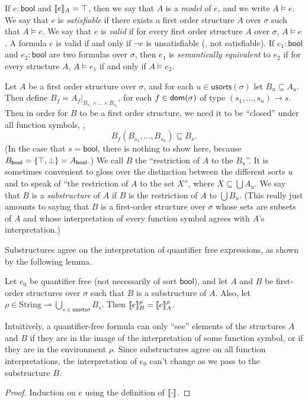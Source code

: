 If $e : \mathsf{bool}$ and $\llbracket{e}\rrbracket_A = \top$,
  then we say that $A$ is a \emph{model} of $e$,
  and we write $A \models e$.
We say that $e$ is \emph{satisfiable} if there exists a first order structure $A$ over $\sigma$ such that $A\models e$.
We say that $e$ is \emph{valid} if for every first order structure $A$ over $\sigma$, $A\models e$.
A formula $e$ is valid if and only if $\neg e$ is unsatisfiable (\ie, not satisfiable).
%
If $e_1 : \mathsf{bool}$ and $e_2 : \mathsf{bool}$ are two formulas over $\sigma$,
then $e_1$  is \emph{semantically equivalent} to $e_2$ if for every structure $A$,
$A\models e_1$ if and only if $A\models e_2$.

Let $A$ be a first order structure over $\sigma$,
and for each $u\in\mathsf{usorts}(\sigma)$ let $B_u\subseteq A_u$.
Then define $B_f = A_f|_{B_{s_1}\times\dots\times B_{s_{n}}}$,
for each $f \in \mathsf{dom}(\sigma)$ of type $(s_1, \dots, s_n)\to s$.
Then in order for $B$ to be a first order structure,
we need it to be ``closed'' under all function symbols, \ie,
\[
  B_f(B_{s_1}, \dots, B_{s_n}) \subseteq B_s.
\]
(In the case that $s = \mathsf{bool}$, there is nothing to show here,
because $B_{\mathsf{bool}} = \left\{{\top, \bot}\right\} = A_{\mathsf{bool}}$.)
We call $B$ the ``restriction of $A$ to the $B_u$''.
It is sometimes convenient to gloss over the distinction between the different sorts $u$
and to speak of ``the restriction of $A$ to the set $X$'', where $X \subseteq \bigcup A_u$.
We say that $B$ is a \emph{substructure} of $A$ if $B$ is the restriction of $A$ to $\bigcup B_u$.
(This really just amounts to saying that $B$ is a first-order structure over $\sigma$
whose sets are subsets of $A$
and whose interpretation of every function symbol agrees with $A$'s interpretation.)

Substructures agree on the interpretation of quantifier free expressions,
as shown by the following lemma.
\begin{lemma}\label{lem:qf-denote-substruct}
  Let $e_0$ be quantifier free (not necessarily of sort $\mathsf{bool}$),
  and let $A$ and $B$ be first-order structures over $\sigma$
  such that $B$ is a substructure of $A$.
  Also, let $\rho \in \mathrm{String} \rightharpoonup \bigcup_{s\in\mathsf{usorts}\sigma} B_s$.
  Then $\llbracket{e}\rrbracket_B^\rho = \llbracket{e}\rrbracket_A^\rho$.

  Intuitively, a quantifier-free formula can only ``see'' elements
    of the structures $A$ and $B$
    if they are in the image of the interpretation of some function symbol,
    or if they are in the environment $\rho$.
  Since substructures agree on all function interpretations,
    the interpretation of $e_0$ can't change as we pass to the substructure $B$.
\end{lemma}
\begin{proof}
  Induction on $e$ using the definition of $\llbracket{\cdot}\rrbracket$.
\end{proof}

